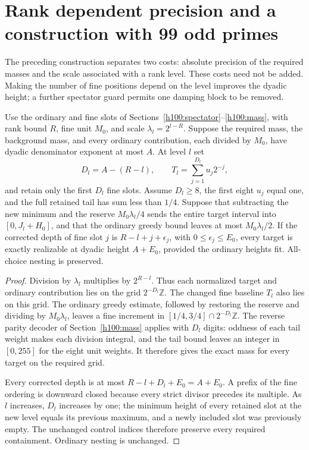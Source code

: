 \section{Rank dependent precision and a construction with 99 odd primes}
\label{v2:sec:refined-constructions}
The preceding construction separates two costs: absolute precision of the required masses and the scale associated with a rank level. These costs need not be added. Making the number of fine positions depend on the level improves the dyadic height; a further spectator guard permits one damping block to be removed.

\begin{lemma}\label{v2:lem:rank-truncation}
Use the ordinary and fine slots of Sections~\ref{h100:spectator}--\ref{h100:mass}, with rank bound $R$, fine unit $M_0$, and scale $\lambda_l=2^{l-R}$. Suppose the required mass, the background mass, and every ordinary contribution, each divided by $M_0$, have dyadic denominator exponent at most $A$. At level $l$ set
\[
 D_l=A-(R-l),\qquad T_l=\sum_{j=1}^{D_l}u_j2^{-j},
\]
and retain only the first $D_l$ fine slots. Assume $D_l\geq8$, the first eight $u_j$ equal one, and the full retained tail has sum less than $1/4$. Suppose that subtracting the new minimum and the reserve $M_0\lambda_l/4$ sends the entire target interval into $[0,J_l+H_0]$, and that the ordinary greedy bound leaves at most $M_0\lambda_l/2$. If the corrected depth of fine slot $j$ is $R-l+j+\epsilon_j$, with $0\leq\epsilon_j\leq E_0$, every target is exactly realizable at dyadic height $A+E_0$, provided the ordinary heights fit. All-choice nesting is preserved.
\end{lemma}
\begin{proof}
Division by $\lambda_l$ multiplies by $2^{R-l}$. Thus each normalized target and ordinary contribution lies on the grid $2^{-D_l}\mathbb Z$. The changed fine baseline $T_l$ also lies on this grid. The ordinary greedy estimate, followed by restoring the reserve and dividing by $M_0\lambda_l$, leaves a fine increment in $[1/4,3/4]\cap2^{-D_l}\mathbb Z$. The reverse parity decoder of Section~\ref{h100:mass} applies with $D_l$ digits: oddness of each tail weight makes each division integral, and the tail bound leaves an integer in $[0,255]$ for the eight unit weights. It therefore gives the exact mass for every target on the required grid.

Every corrected depth is at most $R-l+D_l+E_0=A+E_0$. A prefix of the fine ordering is downward closed because every strict divisor precedes its multiple. As $l$ increases, $D_l$ increases by one; the minimum height of every retained slot at the new level equals its previous maximum, and a newly included slot was previously empty. The unchanged control indices therefore preserve every required containment. Ordinary nesting is unchanged.
\end{proof}

